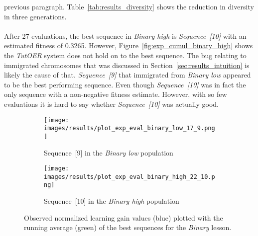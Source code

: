 previous paragraph. Table~\ref{tab:results_diversity} shows the reduction in
diversity in three generations.\\\\
\noindent
After 27 evaluations, the best sequence in \emph{Binary high} is
\emph{Sequence~[10]} with an estimated fitness of 0.3265. However,
Figure~\ref{fig:exp_cumul_binary_high} shows the \emph{TutOER} system does
not hold on to the best sequence. The bug relating to immigrated chromosomes
that was discussed in Section~\ref{sec:results_intuition} is likely the cause
of that. \emph{Sequence~[9]} that immigrated from \emph{Binary low} appeared to
be the best performing sequence. Even though \emph{Sequence~[10]} was in fact
the only sequence with a non-negative fitness estimate. However, with so few
evaluations it is hard to say whether \emph{Sequence~[10]} was actually good.

\begin{figure}[ht]
	\begin{subfigure}{0.9\linewidth}
	\centering
	\texttt{[image: images/results/plot\_exp\_eval\_binary\_low\_17\_9.png]}
	\caption{Sequence~[9] in the \emph{Binary low} population}
	\label{fig:exp_eval_binary_low_17}
	\end{subfigure}
	\hfill
	\begin{subfigure}{0.9\linewidth}
	\centering
	\texttt{[image: images/results/plot\_exp\_eval\_binary\_high\_22\_10.png]}
	\caption{Sequence~[10] in the \emph{Binary high} population}
	\label{fig:exp_eval_binary_high_10}
	\end{subfigure}
	\caption[Evaluations of the best sequences in Binary]{Observed normalized learning gain values (blue) plotted with the
		running average (green) of the best sequences for the \emph{Binary}
	lesson.}
	\label{fig:exp_eval_binary}
\end{figure}

